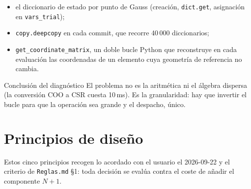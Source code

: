 \documentclass[11pt,letterpaper,oneside]{article}
\newcommand{\code}[1]{\texttt{#1}}
\begin{document}
\begin{itemize}[nosep]
  \item el diccionario de estado por punto de Gauss (creación, \code{dict.get}, asignación en \code{vars\_trial});
  \item \code{copy.deepcopy} en cada commit, que recorre 40\,000 diccionarios;
  \item \code{get\_coordinate\_matrix}, un doble bucle Python que reconstruye en cada evaluación las coordenadas de un elemento cuya geometría de referencia no cambia.
\end{itemize}

\begin{infobox}{Conclusión del diagnóstico}
El problema no es la aritmética ni el álgebra dispersa (la conversión COO a CSR cuesta 10\,ms). Es la granularidad: hay que invertir el bucle para que la operación sea grande y el despacho, único.
\end{infobox}

\section{Principios de diseño}

Estos cinco principios recogen lo acordado con el usuario el 2026-09-22 y el criterio de \code{Reglas.md} §1: toda decisión se evalúa contra el coste de añadir el componente $N+1$.
\end{document}
